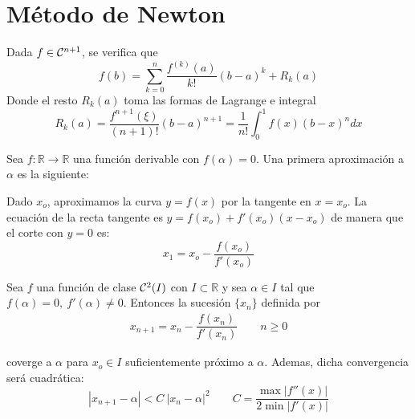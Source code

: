     \section{M{\'e}todo de Newton}          
    \begin{teo}
    Dada $f \in \mathcal{C}^{n+1}$, se verifica que
    $$f(b)=\sum_{k=0}^n \dfrac{f^{(k)}(a)}{k!}(b-a)^k + R_k(a)$$
    Donde el resto $R_k(a)$ toma las formas de Lagrange e integral
    $$R_k(a)=\dfrac{f^{n+1}(\xi)}{(n+1)!}(b-a)^{n+1} = \dfrac{1}{n!} \int_0^1 f(x) (b-x)^n dx$$
    \end{teo}
    \begin{obs}
        Sea $f: \mathbb{R} \longrightarrow \mathbb{R}$ una función derivable con $f(\alpha)=0$. Una primera aproximación a $\alpha$ es la siguiente:
 
        Dado $x_o$, aproximamos la curva $y=f(x)$ por la tangente en $x=x_o$. La ecuación de la recta tangente es $y=f(x_o)+f'(x_o)(x-x_o)$ de manera que el corte con $y=0$ es:
        $$x_1=x_o-\dfrac{f(x_o)}{f'(x_o)}$$
    \end{obs}
    \begin{met}
        Sea $f$ una función de clase $\mathcal{C}^2(I)$ con $I \subset \mathbb R$ y sea $\alpha \in I$ tal que $f(\alpha)=0, \: f'(\alpha)\neq 0$. Entonces la sucesión $\{x_n\}$ definida por 
        \begin{align}
          x_{n+1}=x_n-\dfrac{f(x_n)}{f'(x_n)} \qquad n \geq 0
          \label{met:newton}
        \end{align}
        
        coverge a $\alpha$ para $x_o \in I$ suficientemente próximo a $\alpha$. Ademas, dicha convergencia será cuadrática:
        $$|x_{n+1}-\alpha|< C \: |x_n-\alpha|^2 \qquad C=\dfrac{\max|f''(x)|}{2\min|f'(x)|} $$
    \end{met}
